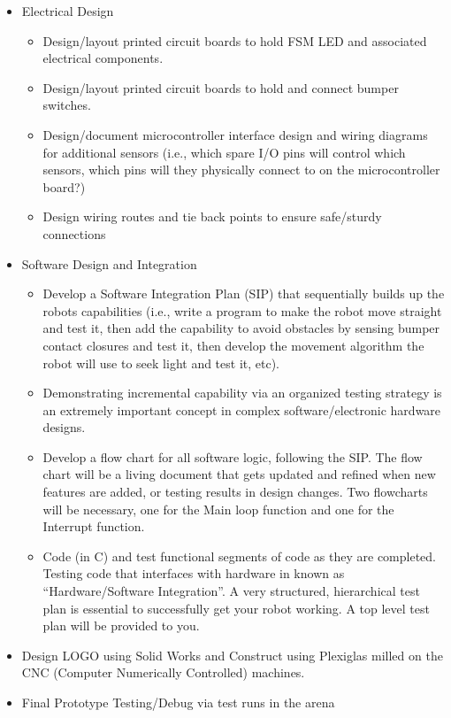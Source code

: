 \documentclass{article}
\begin{document}
\begin{itemize}
    \item Electrical Design
\begin{itemize}
    \item Design/layout printed circuit boards to hold FSM LED and associated electrical components.
\item Design/layout printed circuit boards to hold and connect bumper switches.
\item Design/document microcontroller interface design and wiring diagrams for additional sensors (i.e., which spare I/O pins will control which sensors, which pins will they physically connect to on the microcontroller board?)
\item Design wiring routes and tie back points to ensure safe/sturdy connections
\end{itemize}
\end{itemize}
\begin{itemize}
    \item Software Design and Integration
\begin{itemize}
    \item Develop a Software Integration Plan (SIP) that sequentially builds up the robots capabilities (i.e., write a program to make the robot move straight and test it, then add the capability to avoid obstacles by sensing bumper contact closures and test it, then develop the movement algorithm the robot will use to seek light and test it, etc).
    \item Demonstrating incremental capability via an organized testing strategy is an extremely important concept in complex software/electronic hardware designs.
    \item Develop a flow chart for all software logic, following the SIP. The flow chart will be a living document that gets updated and refined when new features are added, or testing results in design changes. Two flowcharts will be necessary, one for the Main loop function and one for the Interrupt function.
    \item Code (in C) and test functional segments of code as they are completed. Testing code that interfaces with hardware in known as “Hardware/Software Integration”. A very structured, hierarchical test plan is essential to successfully get your robot working. A top level test plan will be provided to you.

\end{itemize}
\end{itemize}
\begin{itemize}
    \item Design LOGO using Solid Works and Construct using Plexiglas milled on the CNC (Computer Numerically Controlled) machines.
\end{itemize}
\begin{itemize}
    \item Final Prototype Testing/Debug via test runs in the arena
\end{itemize}
\end{document}
